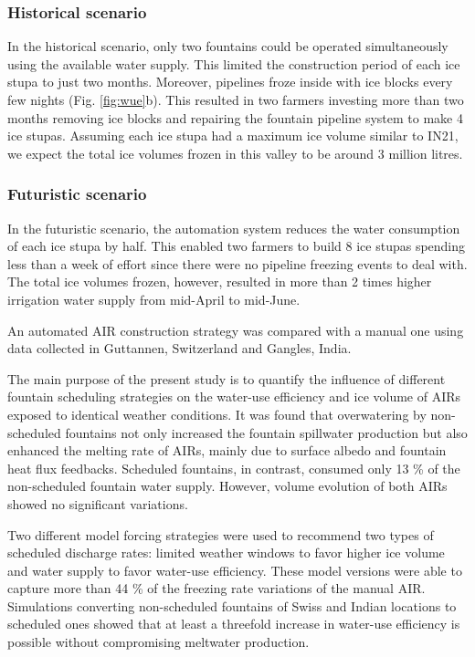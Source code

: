 \documentclass[tc, manuscript]{copernicus}
\begin{document}
\subsubsection{Historical scenario}

In the historical scenario, only two fountains could be operated simultaneously using the available water
supply. This limited the construction period of each ice stupa to just two months. Moreover, pipelines froze
inside with ice blocks every few nights (Fig. \ref{fig:wue}b). This resulted in two farmers investing more than
two months removing ice blocks and repairing the fountain pipeline system to make 4 ice stupas. Assuming each
ice stupa had a maximum ice volume similar to IN21, we expect the total ice volumes frozen in this valley to be
around 3 million litres.   

\subsubsection{Futuristic scenario}

In the futuristic scenario, the automation system reduces the water consumption of each ice stupa by half. This
enabled two farmers to build 8 ice stupas spending less than a week of effort since there were no pipeline
freezing events to deal with. The total ice volumes frozen, however, resulted in more than 2 times higher
irrigation water supply from mid-April to mid-June.

\conclusions

An automated AIR construction strategy was compared with a manual one using data collected in Guttannen,
Switzerland and Gangles, India.

The main purpose of the present study is to quantify the influence of different fountain scheduling strategies
on the water-use efficiency and ice volume of AIRs exposed to identical weather conditions. It was found that
overwatering by non-scheduled fountains not only increased the fountain spillwater production but also enhanced
the melting rate of AIRs, mainly due to surface albedo and fountain heat flux feedbacks. Scheduled fountains, in
contrast, consumed only 13 \% of the non-scheduled fountain water supply. However, volume evolution of both AIRs
showed no significant variations. 

Two different model forcing strategies were used to recommend two types of scheduled discharge rates: limited
weather windows to favor higher ice volume and water supply to favor water-use efficiency. These model versions
were able to capture more than 44 \% of the freezing rate variations of the manual AIR. Simulations converting
non-scheduled fountains of Swiss and Indian locations to scheduled ones showed that at least a threefold increase
in water-use efficiency is possible without compromising meltwater production.
\end{document}
